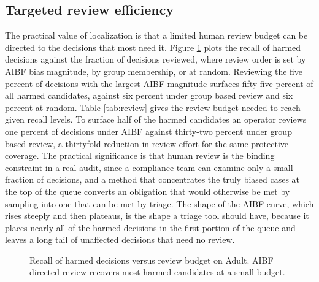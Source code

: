 \documentclass[conference]{IEEEtran}
\begin{document}
\subsection{Targeted review efficiency}
The practical value of localization is that a limited human review budget can be
directed to the decisions that most need it. Figure \ref{fig:review} plots the recall
of harmed decisions against the fraction of decisions reviewed, where review order is
set by AIBF bias magnitude, by group membership, or at random. Reviewing the five
percent of decisions with the largest AIBF magnitude surfaces fifty-five percent of
all harmed candidates, against six percent under group based review and six percent at
random. Table \ref{tab:review} gives the review budget needed to reach given recall
levels. To surface half of the harmed candidates an operator reviews one percent of
decisions under AIBF against thirty-two percent under group based review, a
thirtyfold reduction in review effort for the same protective coverage. The practical
significance is that human review is the binding constraint in a real audit, since a
compliance team can examine only a small fraction of decisions, and a method that
concentrates the truly biased cases at the top of the queue converts an obligation that
would otherwise be met by sampling into one that can be met by triage. The shape of the
AIBF curve, which rises steeply and then plateaus, is the shape a triage tool
should have, because it places nearly all of the harmed decisions in the first portion
of the queue and leaves a long tail of unaffected decisions that need no review.

\begin{figure}[t]
\centering
{}
\caption{Recall of harmed decisions versus review budget on Adult. AIBF directed
review recovers most harmed candidates at a small budget.}
\label{fig:review}
\end{figure}
\end{document}
